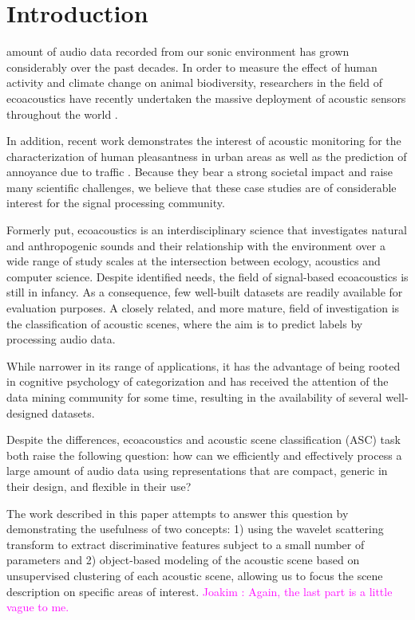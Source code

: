 \documentclass[journal]{IEEEtran}
\newcommand{\ja}[1]{\textcolor{magenta}{Joakim : #1}}
\begin{document}
\section{Introduction}

 amount of audio data recorded from our sonic environment has grown considerably over the past decades.
In order to measure the effect of human activity and climate change on animal biodiversity, researchers in the field of ecoacoustics \cite{ECOACOUSTICS2014, krause} have recently undertaken the massive deployment of acoustic sensors throughout the world \cite{warren2006urban, NessSST13, stowell13a, stowell13b}. 

In addition, recent work demonstrates the interest of acoustic monitoring for the characterization of human pleasantness in urban areas \cite{lafayPartI, guyot2005urban, ricciardi2015sound} as well as the prediction of annoyance due to traffic \cite{gloaguen}.
Because they bear a strong societal impact and raise many scientific challenges, we believe that these case studies are of considerable interest for the signal processing community.

Formerly put, ecoacoustics is an interdisciplinary science that investigates natural and anthropogenic sounds and their relationship with the environment over a wide range of study scales at the intersection between ecology, acoustics and computer science. Despite identified needs, the field of signal-based ecoacoustics is still in infancy.
As a consequence, few well-built datasets are readily available for evaluation purposes.
A closely related, and more mature, field of investigation is the classification of acoustic scenes, where the aim is to predict labels by processing audio data. 

While narrower in its range of applications, it has the advantage of being rooted in cognitive psychology of categorization \cite{dubois2006cognitive, maffiolo_caracterisation_1999, guastavino_ideal_2006} and has received the attention of the data mining community for some time, resulting in the availability of several well-designed datasets.

Despite the differences, ecoacoustics and acoustic scene classification (ASC) task both raise the following question: how can we efficiently and effectively process a large amount of audio data using representations that are compact, generic in their design, and flexible in their use?

The work described in this paper attempts to answer this question by demonstrating the usefulness of two concepts: 1) using the wavelet scattering transform to extract discriminative features subject to a small number of parameters and 2) object-based modeling of the acoustic scene based on unsupervised clustering of each acoustic scene, allowing us to focus the scene description on specific areas of interest. \ja{Again, the last part is a little vague to me.}
\end{document}
